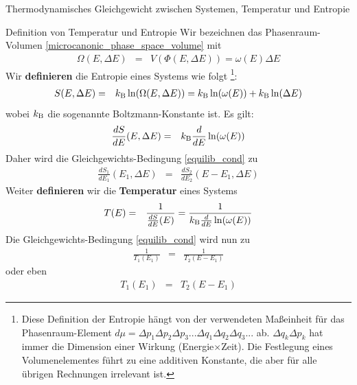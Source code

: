 \begin{chapter}{\titlestr}
\begin{section}{Thermodynamisches Gleichgewicht zwischen Systemen, Temperatur und Entropie}
\begin{subsection}{Definition von Temperatur und Entropie}
Wir bezeichnen das Phasenraum-Volumen \ref{microcanonic_phase_space_volume} mit
\begin{eqnarray*}
\Omega(E,\Delta E) &=& V(\Phi(E,\Delta E)) = \omega(E)\Delta E
\end{eqnarray*}
Wir \textbf{definieren} die Entropie eines Systems wie folgt
\footnote{Diese Definition der Entropie hängt von der verwendeten Maßeinheit für das Phasenraum-Element $d\mu = \Delta p_1\Delta p_2\Delta p_3...\Delta q_1\Delta q_2\Delta q_3...
$ ab. $\Delta q_k\Delta p_k$ hat immer die Dimension einer Wirkung (Energie$\times$Zeit). Die Festlegung eines Volumenelementes führt zu eine additiven Konstante, die aber für alle übrigen Rechnungen irrelevant ist.}:
\begin{eqnarray}
\label{entropy_def}
S(E,\Delta E) &=& k_{\mathrm{B}} \ln (\Omega(E,\Delta E)) = k_{\mathrm{B}} \ln (\omega(E))+k_{\mathrm{B}} \ln (\Delta E)
\end{eqnarray}
wobei $k_{\mathrm{B}} $ die sogenannte Boltzmann-Konstante ist. Es gilt:
\begin{eqnarray*}
\frac{dS}{dE}(E,\Delta E) &=& k_{\mathrm{B}} \frac{d}{dE}\ln(\omega(E))
\end{eqnarray*}
Daher wird die Gleichgewichts-Bedingung \ref{equilib_cond} zu
\begin{eqnarray*}
\frac{dS_1}{dE_1}(E_1,\Delta E) &=& \frac{dS_2}{dE_2}(E-E_1,\Delta E)
\end{eqnarray*}
Weiter \textbf{definieren} wir die \textbf{Temperatur} eines Systems
\begin{eqnarray}
\label{temperature_def}
T(E) &=& \frac{1}{\frac{dS}{dE}(E)}=\frac{1}{k_{\mathrm{B}} \frac{d}{dE}\ln(\omega(E))}
\end{eqnarray}
Die Gleichgewichts-Bedingung \ref{equilib_cond} wird nun zu
\begin{eqnarray*}
\frac{1}{T_1(E_1)} &=& \frac{1}{T_2(E-E_1)}
\end{eqnarray*}
oder eben
\begin{eqnarray*}
T_1(E_1) &=& T_2(E-E_1)
\end{eqnarray*}
\end{subsection}
\end{section}


\end{chapter}
